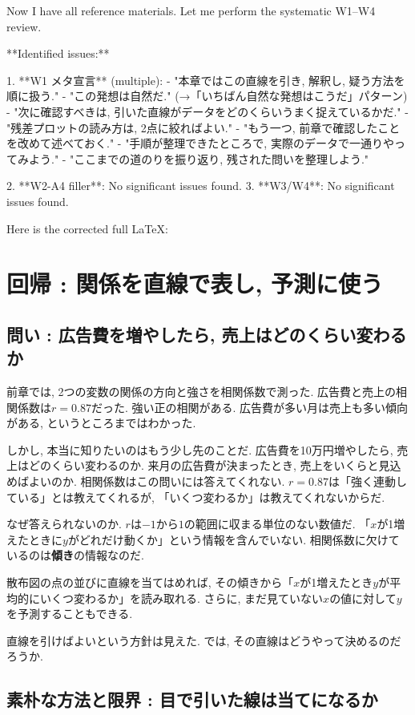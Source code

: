 ﻿Now I have all reference materials. Let me perform the systematic W1–W4 review.

**Identified issues:**

1. **W1 メタ宣言** (multiple):
   - "本章ではこの直線を引き, 解釈し, 疑う方法を順に扱う."
   - "この発想は自然だ." (→「いちばん自然な発想はこうだ」パターン)
   - "次に確認すべきは, 引いた直線がデータをどのくらいうまく捉えているかだ."
   - "残差プロットの読み方は, 2点に絞ればよい."
   - "もう一つ, 前章で確認したことを改めて述べておく."
   - "手順が整理できたところで, 実際のデータで一通りやってみよう."
   - "ここまでの道のりを振り返り, 残された問いを整理しよう."

2. **W2-A4 filler**: No significant issues found.
3. **W3/W4**: No significant issues found.

Here is the corrected full LaTeX:

\section{回帰 : 関係を直線で表し, 予測に使う}

\subsection{問い : 広告費を増やしたら, 売上はどのくらい変わるか}

前章では, 2つの変数の関係の方向と強さを相関係数で測った.
広告費と売上の相関係数は$r = 0.87$だった.
強い正の相関がある. 広告費が多い月は売上も多い傾向がある, というところまではわかった.

しかし, 本当に知りたいのはもう少し先のことだ.
広告費を10万円増やしたら, 売上はどのくらい変わるのか.
来月の広告費が決まったとき, 売上をいくらと見込めばよいのか.
相関係数はこの問いには答えてくれない.
$r = 0.87$は「強く連動している」とは教えてくれるが, 「いくつ変わるか」は教えてくれないからだ.

なぜ答えられないのか.
$r$は$-1$から$1$の範囲に収まる単位のない数値だ.
「$x$が1増えたときに$y$がどれだけ動くか」という情報を含んでいない.
相関係数に欠けているのは\textbf{傾き}の情報なのだ.

散布図の点の並びに直線を当てはめれば, その傾きから「$x$が1増えたとき$y$が平均的にいくつ変わるか」を読み取れる.
さらに, まだ見ていない$x$の値に対して$y$を予測することもできる.

直線を引けばよいという方針は見えた.
では, その直線はどうやって決めるのだろうか.


\subsection{素朴な方法と限界 : 目で引いた線は当てになるか}

